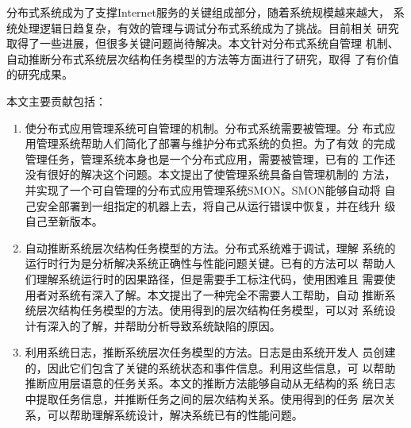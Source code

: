 \begin{cabstract}


  分布式系统成为了支撑Internet服务的关键组成部分，随着系统规模越来越大，
  系统处理逻辑日趋复杂，有效的管理与调试分布式系统成为了挑战。目前相关
  研究取得了一些进展，但很多关键问题尚待解决。本文针对分布式系统自管理
  机制、自动推断分布式系统层次结构任务模型的方法等方面进行了研究，取得
  了有价值的研究成果。

  本文主要贡献包括：

  \begin{enumerate}

    \item 使分布式应用管理系统可自管理的机制。分布式系统需要被管理。分
    布式应用管理系统帮助人们简化了部署与维护分布式系统的负担。为了有效
    的完成管理任务，管理系统本身也是一个分布式应用，需要被管理，已有的
    工作还没有很好的解决这个问题。本文提出了使管理系统具备自管理机制的
    方法，并实现了一个可自管理的分布式应用管理系统SMON。SMON能够自动将
    自己安全部署到一组指定的机器上去，将自己从运行错误中恢复，并在线升
    级自己至新版本。

    \item 自动推断系统层次结构任务模型的方法。分布式系统难于调试，理解
    系统的运行时行为是分析解决系统正确性与性能问题关键。已有的方法可以
    帮助人们理解系统运行时的因果路径，但是需要手工标注代码，使用困难且
    需要使用者对系统有深入了解。本文提出了一种完全不需要人工帮助，自动
    推断系统层次结构任务模型的方法。使用得到的层次结构任务模型，可以对
    系统设计有深入的了解，并帮助分析导致系统缺陷的原因。

    \item 利用系统日志，推断系统层次任务模型的方法。日志是由系统开发人
    员创建的，因此它们包含了关键的系统状态和事件信息。利用这些信息，可
    以帮助推断应用层语意的任务关系。本文的推断方法能够自动从无结构的系
    统日志中提取任务信息，并推断任务之间的层次结构关系。使用得到的任务
    层次关系，可以帮助理解系统设计，解决系统已有的性能问题。

  \end{enumerate}

\end{cabstract}


